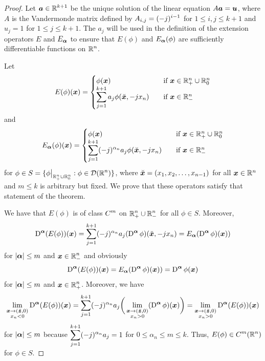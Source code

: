 \begin{proof}
Let $\displaystyle {\bm{a}} \in \mathbb{R}^{k+1}$ be the unique solution of
the linear equation $A {\bm{a}} = {\bm{u}}$, where $A$ is the
Vandermonde matrix defined by $\displaystyle A_{i,j} = (-j)^{i-1}$ for
$1 \leq i,j \leq k+1$ and $u_j = 1$ for $1 \leq j \leq k+1$.  The
$a_j$ will be used in the definition of the extension operators $E$
and $E_{{\bm{\alpha}}}$ to ensure that $E(\phi)$ and
$E_{{\bm{\alpha}}}(\phi)$ are
sufficiently differentiable functions on $\displaystyle \mathbb{R}^n$.

Let
\[
E(\phi)({\bm{x}})
= \begin{cases}
\phi({\bm{x}}) & \quad \text{if} \ {\bm{x}} \in \mathbb{R}^n_+ \cup \mathbb{R}^n_0 \\
\displaystyle \sum_{j=1}^{k+1} a_j \phi(\breve{{\bm{x}}},-jx_n)
& \quad \text{if} \ {\bm{x}} \in \mathbb{R}^n_-
\end{cases}
\]
and
\[
E_{{\bm{\alpha}}}(\phi)({\bm{x}})
= \begin{cases}
\phi({\bm{x}}) & \quad \text{if} \ {\bm{x}} \in \mathbb{R}^n_+ \cup \mathbb{R}^n_0 \\
\displaystyle \sum_{j=1}^{k+1} (-j)^{\alpha_n} a_j \phi(\breve{{\bm{x}}},-jx_n)
& \quad \text{if} \ {\bm{x}} \in \mathbb{R}^n_-
\end{cases}
\]
for $\displaystyle \phi \in S = \{ \phi\big|_{\mathbb{R}^n_+ \cup \mathbb{R}^n_0} :
\phi \in \mathcal{D}(\mathbb{R}^n) \}$,
where $\breve{{\bm{x}}} = (x_1,x_2,\ldots, x_{n-1})$ for all
${\bm{x}} \in \mathbb{R}^n$ and $m \leq k$ is arbitrary but fixed.  We prove
that these operators satisfy that statement of the theorem.

We have that $E(\phi)$ is of class $\displaystyle C^m$ on
$\displaystyle \mathbb{R}^n_+ \cup \mathbb{R}^n_-$ for all $\phi \in S$.
Moreover,
\[
\operatorname{D}^{{\bm{\alpha}}} (E(\phi))({\bm{x}}) 
= \sum_{j=1}^{k+1} (-j)^{\alpha_n} a_j (\operatorname{D}^{{\bm{\alpha}}} \phi)
(\breve{{\bm{x}}},-jx_n)
= E_{{\bm{\alpha}}}(\operatorname{D}^{{\bm{\alpha}}} \phi)({\bm{x}}))
\]
for $|{\bm{\alpha}}| \leq m$ and $\displaystyle {\bm{x}} \in \mathbb{R}^n_-$
and obviously
\[
\operatorname{D}^{{\bm{\alpha}}} (E(\phi))({\bm{x}}) = E_{{\bm{\alpha}}}
(\operatorname{D}^{{\bm{\alpha}}} \phi)({\bm{x}})) = \operatorname{D}^{{\bm{\alpha}}} \phi ({\bm{x}})
\]
for $|{\bm{\alpha}}| \leq m$ and $\displaystyle {\bm{x}} \in \mathbb{R}^n_+$.
Moreover, we have
\[
\lim_{\substack{{\bm{x}}\to (\breve{{\bm{z}}},0)\\x_n<0}}
\operatorname{D}^{{\bm{\alpha}}} (E(\phi))({\bm{x}}) 
= \sum_{j=1}^{k+1} (-j)^{\alpha_n} a_j
\bigg( \lim_{\substack{{\bm{x}}\to (\breve{{\bm{z}}},0)\\x_n>0}}
(\operatorname{D}^{{\bm{\alpha}}} \phi)({\bm{x}}) \bigg) =
\lim_{\substack{{\bm{x}}\to (\breve{{\bm{z}}},0)\\x_n>0}}
\operatorname{D}^{{\bm{\alpha}}} (E(\phi))({\bm{x}})
\]
for $|{\bm{\alpha}}| \leq m$
because $\displaystyle \sum_{j=1}^{k+1} (-j)^{\alpha_n}a_j = 1$ for
$0 \leq \alpha_n \leq m \leq k$.  Thus,
$\displaystyle E(\phi) \in C^m(\mathbb{R}^n)$ for $\phi \in S$.


\end{proof}
